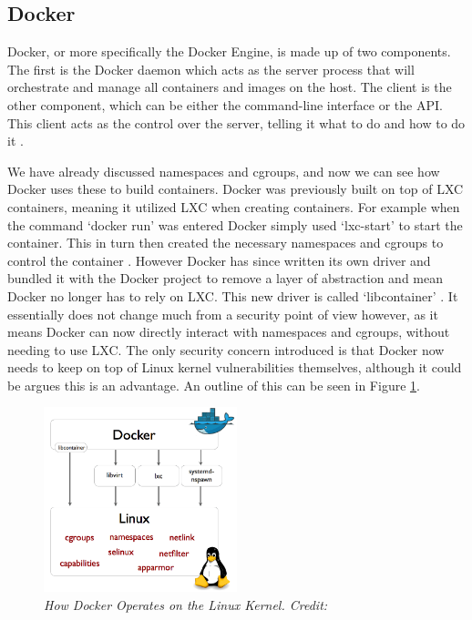 \documentclass{article}
\begin{document}
\subsection{Docker}
\label{subs:Docker}

Docker, or more specifically the Docker Engine, is made up of two components. The first is the Docker daemon which acts as the server process that will orchestrate and manage all containers and images on the host. The client is the other component, which can be either the command-line interface or the API. This client acts as the control over the server, telling it what to do and how to do it \citep{Docker2016}.

We have already discussed namespaces and cgroups, and now we can see how Docker uses these to build containers. Docker was previously built on top of LXC containers, meaning it utilized LXC when creating containers. For example when the command `docker run' was entered Docker simply used `lxc-start' to start the container. This in turn then created the necessary namespaces and cgroups to control the container \citep{Petazzoni2013}. However Docker has since written its own driver and bundled it with the Docker project to remove a layer of abstraction and mean Docker no longer has to rely on LXC. This new driver is called `libcontainer' \citep{Hykes2014}. It essentially does not change much from a security point of view however, as it means Docker can now directly interact with namespaces and cgroups, without needing to use LXC. The only security concern introduced is that Docker now needs to keep on top of Linux kernel vulnerabilities themselves, although it could be argues this is an advantage. An outline of this can be seen in Figure \ref{fig:kernel}.

\begin{figure}[!h]
\centering
\includegraphics*[width=0.5\textwidth]{components/images/docker-driver}
\caption{\em How Docker Operates on the Linux Kernel. Credit: \citep{Hykes2014}}
\label{fig:kernel}
\end{figure}
\end{document}
